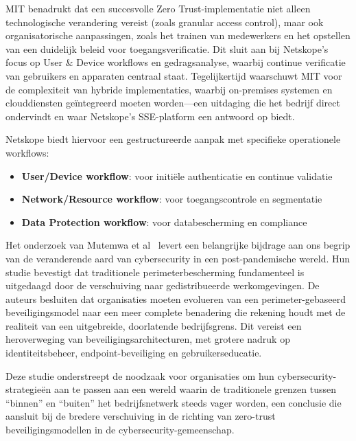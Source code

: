 \vspace{2ex}

MIT benadrukt dat een succesvolle Zero Trust-implementatie niet alleen technologische verandering vereist (zoals granular access control), maar ook organisatorische aanpassingen, zoals het trainen van medewerkers en het opstellen van een duidelijk beleid voor toegangsverificatie. 
Dit sluit aan bij Netskope’s focus op User \& Device workflows en gedragsanalyse, waarbij continue verificatie van gebruikers en apparaten centraal staat. 
Tegelijkertijd waarschuwt MIT voor de complexiteit van hybride implementaties, waarbij on-premises systemen en clouddiensten geïntegreerd moeten worden—een uitdaging die het bedrijf direct ondervindt en waar Netskope’s SSE-platform een antwoord op biedt.

\vspace{2ex}

Netskope biedt hiervoor een gestructureerde aanpak met specifieke operationele workflows:
\begin{itemize}
  \item \textbf{User/Device workflow}: voor initiële authenticatie en continue validatie
  \item \textbf{Network/Resource workflow}: voor toegangscontrole en segmentatie
  \item \textbf{Data Protection workflow}: voor databescherming en compliance
\end{itemize}

\vspace{2ex}

Het onderzoek van Mutemwa et al~\autocite{ACM2021} levert een belangrijke bijdrage aan ons begrip van de veranderende aard van cybersecurity in een post-pandemische wereld. Hun studie bevestigt dat traditionele perimeterbescherming fundamenteel is uitgedaagd door de verschuiving naar gedistribueerde werkomgevingen.
De auteurs besluiten dat organisaties moeten evolueren van een perimeter-gebaseerd beveiligingsmodel naar een meer complete benadering die rekening houdt met de realiteit van een uitgebreide, doorlatende bedrijfsgrens. Dit vereist een heroverweging van beveiligingsarchitecturen, met grotere nadruk op identiteitsbeheer, endpoint-beveiliging en gebruikerseducatie.

\vspace{2ex}

Deze studie onderstreept de noodzaak voor organisaties om hun cybersecurity-strategieën aan te passen aan een wereld waarin de traditionele grenzen tussen “binnen” en “buiten” het bedrijfsnetwerk steeds vager worden, een conclusie die aansluit bij de bredere verschuiving in de richting van zero-trust beveiligingsmodellen in de cybersecurity-gemeenschap.